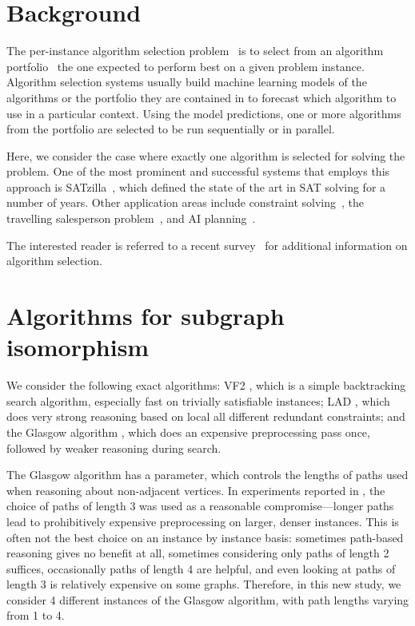 \documentclass{llncs}
\begin{document}
\section{Background}


The per-instance algorithm selection problem~\cite{rice_algorithm_1976} is to select from an
algorithm portfolio~\cite{huberman_economics_1997,gomes_algorithm_2001} the one expected to perform
best on a given problem instance. Algorithm selection systems usually build machine learning models
of the algorithms or the portfolio they are contained in to forecast which algorithm to use in a
particular context. Using the model predictions, one or more algorithms from the portfolio are
selected to be run sequentially or in parallel.

Here, we consider the case where exactly one algorithm is selected for solving the problem. One of
the most prominent and successful systems that employs this approach is
SATzilla~\cite{xu_satzilla_2008}, which defined the state of the art in SAT solving for a number of
years. Other application areas include constraint solving~\cite{omahony_using_2008}, the travelling
salesperson problem~\cite{kotthoff_improving_2015}, and AI planning~\cite{seipp_learning_2012}.

The interested reader is referred to a recent survey~\cite{kotthoff_algorithm_2014} for additional
information on algorithm selection.

\section{Algorithms for subgraph isomorphism}

We consider the following exact algorithms: VF2 \cite{Cordella:2004}, which is a simple backtracking
search algorithm, especially fast on trivially satisfiable instances; LAD \cite{Solnon:2010}, which
does very strong reasoning based on local all different redundant constraints; and the Glasgow
algorithm \cite{McCreesh:2015}, which does an expensive preprocessing pass once, followed by weaker
reasoning during search.

 The Glasgow algorithm has a parameter, which controls the lengths of paths used when reasoning
 about non-adjacent vertices.  In experiments reported in \cite{McCreesh:2015}, the choice of paths
 of length 3 was used as a reasonable compromise---longer paths lead to prohibitively expensive
 preprocessing on larger, denser instances. This is often not the best choice on an instance by
 instance basis: sometimes path-based reasoning gives no benefit at all, sometimes considering only
 paths of length 2 suffices, occasionally paths of length 4 are helpful, and even looking at paths
 of length 3 is relatively expensive on some graphs. Therefore, in this new study, we consider 4
 different instances of the Glasgow algorithm, with path lengths varying from 1 to 4.
\end{document}
